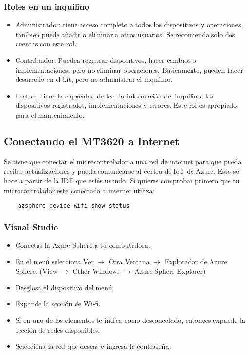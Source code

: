 \subsubsection{Roles en un inquilino}
\begin{itemize}
	\item 
	Administrador: tiene acceso completo a todos los dispositivos y operaciones, también puede añadir o eliminar a otros usuarios. Se recomienda solo dos cuentas con este rol.
	\item 
	Contribuidor: Pueden registrar dispositivos, hacer cambios o implementaciones, pero no eliminar operaciones. Básicamente, pueden hacer desarrollo en el kit, pero no administrar el inquilino.
	\item 
	Lector: Tiene la capacidad de leer la información del inquilino, los dispositivos registrados, implementaciones y errores. Este rol es apropiado para el mantenimiento.
	
\end{itemize}

\subsection{Conectando el MT3620 a Internet}
Se tiene que conectar el microcontrolador a una red de internet para que pueda recibir actualizaciones y pueda comunicarse al centro de IoT de Azure. Esto se hace a partir de la IDE que estés usando.
Si quieres comprobar primero que tu microcontrolador este conectado a internet utiliza:

\begin{verbatim}
	azsphere device wifi show-status
\end{verbatim}

\subsubsection{Visual Studio}
\begin{itemize}
	\item
	Conectas la Azure Sphere a tu computadora.
	\item 
	En el menú selecciona Ver $\rightarrow$ Otra Ventana $\rightarrow$ Explorador de Azure Sphere.
	(View $\rightarrow$ Other Windows $\rightarrow$ Azure Sphere Explorer)
	\item 
	Desglosa el dispositivo del menú. 
	\item 
	Expande la sección de Wi-fi.
	\item 
	Si en uno de los elementos te indica como desconectado, entonces expande la sección de redes disponibles.
	\item 
	Selecciona la red que deseas e ingresa la contraseña.
\end{itemize}

